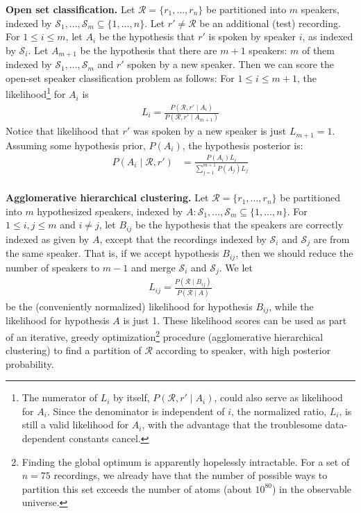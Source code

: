 \documentclass[a4paper,oneside,12pt,english]{report}
\def\Rset{\mathcal{R}}
\def\Sset{\mathcal{S}}
\begin{document}
\noindent\textbf{Open set classification.} Let $\Rset=\{r_1,\ldots,r_n\}$ be partitioned into $m$ speakers, indexed by $\Sset_1,\ldots,\Sset_m\subseteq\{1,\ldots,n\}$. Let $r'\ne\Rset$ be an additional (test) recording. For $1\le i\le m$, let $A_i$ be the hypothesis that $r'$ is spoken by speaker $i$, as indexed by $\Sset_i$. Let $A_{m+1}$ be the hypothesis that there are $m+1$ speakers: $m$ of them indexed by $\Sset_1,\ldots,\Sset_m$ and $r'$ spoken by a new speaker.  Then we can score the open-set speaker classification problem as follows: For $1\le i\le m+1$, the likelihood\footnote{The numerator of $L_i$ by itself, $P(\Rset,r'\mid A_i)$, could also serve as likelihood for $A_i$. Since the denominator is independent of $i$, the normalized ratio, $L_i$, is still a valid likelihood for $A_i$, with the advantage that the troublesome data-dependent constants cancel.} for $A_i$ is 
\begin{align}
L_i=\frac{P(\Rset,r'\mid A_i)}{P(\Rset,r'\mid A_{m+1})}
\end{align}
Notice that likelihood that $r'$ was spoken by a new speaker is just $L_{m+1}=1$. Assuming some hypothesis prior, $P(A_i)$, the hypothesis posterior is:
\begin{align}
P(A_i\mid\Rset,r') &= \frac{P(A_i)L_i}{\sum_{j=1}^{m+1} P(A_j)L_j}
\end{align}\\
	
\noindent\textbf{Agglomerative hierarchical clustering.} Let $\Rset=\{r_1,\ldots,r_n\}$ be partitioned into $m$ hypothesized speakers, indexed by $A:\Sset_1,\ldots,\Sset_m\subseteq\{1,\ldots,n\}$. For $1\le i,j\le m$ and $i\ne j$, let $B_{ij}$ be the hypothesis that the speakers are correctly indexed as given by $A$, except that the recordings indexed by $\Sset_i$ and $\Sset_j$ are from the same speaker. That is, if we accept hypothesis $B_{ij}$, then we should reduce the number of speakers to $m-1$ and merge $\Sset_i$ and $\Sset_j$. We let 
\begin{align}
\label{eq:LR_AHC}
L_{ij}=\frac{P(\Rset\mid B_{ij})}{P(\Rset\mid A)}
\end{align}
be the (conveniently normalized) likelihood for hypothesis $B_{ij}$,  while the likelihood for hypothesis $A$ is just 1. These likelihood scores can be used as part of an iterative, greedy optimization\footnote{Finding the global optimum is apparently hopelessly intractable. For a set of $n=75$ recordings, we already have that the number of possible ways to partition this set exceeds the number of atoms (about $10^{80}$) in the observable universe.} procedure (agglomerative hierarchical clustering) to find a partition of $\Rset$ according to speaker, with high posterior probability. \\
\end{document}
